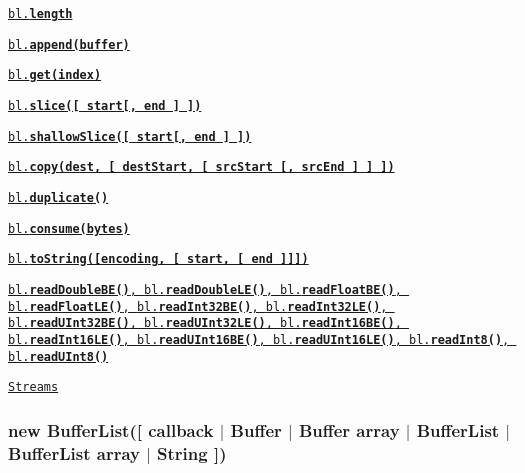 \begin{DoxyItemize}
\item \href{#ctor}{\tt {}}
\item \href{#length}{\tt {\ttfamily bl.{\bfseries length}}}
\item \href{#append}{\tt {\ttfamily bl.{\bfseries append(buffer)}}}
\item \href{#get}{\tt {\ttfamily bl.{\bfseries get(index)}}}
\item \href{#slice}{\tt {\ttfamily bl.{\bfseries slice(\mbox{[} start\mbox{[}, end \mbox{]} \mbox{]})}}}
\item \href{#shallowSlice}{\tt {\ttfamily bl.{\bfseries shallow\+Slice(\mbox{[} start\mbox{[}, end \mbox{]} \mbox{]})}}}
\item \href{#copy}{\tt {\ttfamily bl.{\bfseries copy(dest, \mbox{[} dest\+Start, \mbox{[} src\+Start \mbox{[}, src\+End \mbox{]} \mbox{]} \mbox{]})}}}
\item \href{#duplicate}{\tt {\ttfamily bl.{\bfseries duplicate()}}}
\item \href{#consume}{\tt {\ttfamily bl.{\bfseries consume(bytes)}}}
\item \href{#toString}{\tt {\ttfamily bl.{\bfseries to\+String(\mbox{[}encoding, \mbox{[} start, \mbox{[} end \mbox{]}\mbox{]}\mbox{]})}}}
\item \href{#readXX}{\tt {\ttfamily bl.{\bfseries read\+Double\+B\+E()}}, {\ttfamily bl.{\bfseries read\+Double\+L\+E()}}, {\ttfamily bl.{\bfseries read\+Float\+B\+E()}}, {\ttfamily bl.{\bfseries read\+Float\+L\+E()}}, {\ttfamily bl.{\bfseries read\+Int32\+B\+E()}}, {\ttfamily bl.{\bfseries read\+Int32\+L\+E()}}, {\ttfamily bl.{\bfseries read\+U\+Int32\+B\+E()}}, {\ttfamily bl.{\bfseries read\+U\+Int32\+L\+E()}}, {\ttfamily bl.{\bfseries read\+Int16\+B\+E()}}, {\ttfamily bl.{\bfseries read\+Int16\+L\+E()}}, {\ttfamily bl.{\bfseries read\+U\+Int16\+B\+E()}}, {\ttfamily bl.{\bfseries read\+U\+Int16\+L\+E()}}, {\ttfamily bl.{\bfseries read\+Int8()}}, {\ttfamily bl.{\bfseries read\+U\+Int8()}}}
\item \href{#streams}{\tt Streams} 

 \label{_ctor}%
 \subsubsection*{new Buffer\+List(\mbox{[} callback $\vert$ Buffer $\vert$ Buffer array $\vert$ Buffer\+List $\vert$ Buffer\+List array $\vert$ String \mbox{]})}
\end{DoxyItemize}

